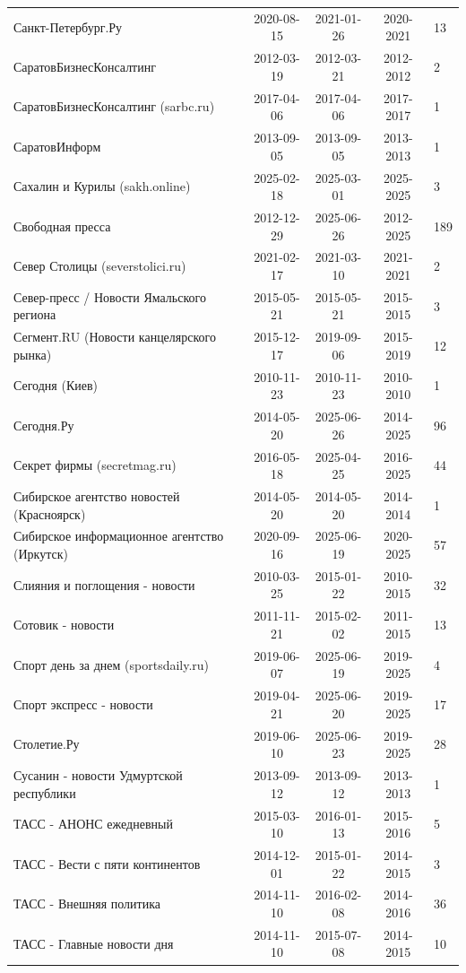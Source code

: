 \begin{longtable}{p{6cm}cccp{2cm}}
Санкт-Петербург.Ру & 2020-08-15 & 2021-01-26 & 2020-2021 & 13\\
СаратовБизнесКонсалтинг & 2012-03-19 & 2012-03-21 & 2012-2012 & 2\\
СаратовБизнесКонсалтинг (sarbc.ru) & 2017-04-06 & 2017-04-06 & 2017-2017 & 1\\
СаратовИнформ & 2013-09-05 & 2013-09-05 & 2013-2013 & 1\\
Сахалин и Курилы (sakh.online) & 2025-02-18 & 2025-03-01 & 2025-2025 & 3\\
Свободная пресса & 2012-12-29 & 2025-06-26 & 2012-2025 & 189\\
Север Столицы (severstolici.ru) & 2021-02-17 & 2021-03-10 & 2021-2021 & 2\\
Север-пресс / Новости Ямальского региона & 2015-05-21 & 2015-05-21 & 2015-2015 & 3\\
Сегмент.RU (Новости канцелярского рынка) & 2015-12-17 & 2019-09-06 & 2015-2019 & 12\\
Сегодня (Киев) & 2010-11-23 & 2010-11-23 & 2010-2010 & 1\\
Сегодня.Ру & 2014-05-20 & 2025-06-26 & 2014-2025 & 96\\
Секрет фирмы (secretmag.ru) & 2016-05-18 & 2025-04-25 & 2016-2025 & 44\\
Сибирское агентство новостей (Красноярск) & 2014-05-20 & 2014-05-20 & 2014-2014 & 1\\
Сибирское информационное агентство (Иркутск) & 2020-09-16 & 2025-06-19 & 2020-2025 & 57\\
Слияния и поглощения - новости & 2010-03-25 & 2015-01-22 & 2010-2015 & 32\\
Сотовик - новости & 2011-11-21 & 2015-02-02 & 2011-2015 & 13\\
Спорт день за днем (sportsdaily.ru) & 2019-06-07 & 2025-06-19 & 2019-2025 & 4\\
Спорт экспресс - новости & 2019-04-21 & 2025-06-20 & 2019-2025 & 17\\
Столетие.Ру & 2019-06-10 & 2025-06-23 & 2019-2025 & 28\\
Сусанин - новости Удмуртской республики & 2013-09-12 & 2013-09-12 & 2013-2013 & 1\\
ТАСС - АНОНС ежедневный & 2015-03-10 & 2016-01-13 & 2015-2016 & 5\\
ТАСС - Вести с пяти континентов & 2014-12-01 & 2015-01-22 & 2014-2015 & 3\\
ТАСС - Внешняя политика & 2014-11-10 & 2016-02-08 & 2014-2016 & 36\\
ТАСС - Главные новости дня & 2014-11-10 & 2015-07-08 & 2014-2015 & 10\\

\end{longtable}

